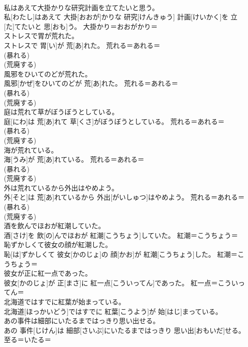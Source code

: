 \documentclass[8pt]{extreport}
\begin{document}
\begin{CJK}{UTF8}{min}
{\\	私はあえて大掛かりな研究計画を立てたいと思う。	
\\	私[わたし]はあえて 大掛[おおが]かりな 研究[けんきゅう] 計画[けいかく]を 立[た]てたいと 思[おも]う。	大掛かり＝おおがかり＝ 
\\	ストレスで胃が荒れた。	
\\	ストレスで 胃[い]が 荒[あ]れた。	荒れる＝あれる＝ 
\\	(暴れる) 
\\	(荒廃する) 
\\	風邪をひいてのどが荒れた。	
\\	風邪[かぜ]をひいてのどが 荒[あ]れた。	荒れる＝あれる＝ 
\\	(暴れる) 
\\	(荒廃する) 
\\	庭は荒れて草がぼうぼうとしている。	
\\	庭[にわ]は 荒[あ]れて 草[くさ]がぼうぼうとしている。	荒れる＝あれる＝ 
\\	(暴れる) 
\\	(荒廃する) 
\\	海が荒れている。	
\\	海[うみ]が 荒[あ]れている。	荒れる＝あれる＝ 
\\	(暴れる) 
\\	(荒廃する) 
\\	外は荒れているから外出はやめよう。	
\\	外[そと]は 荒[あ]れているから 外出[がいしゅつ]はやめよう。	荒れる＝あれる＝ 
\\	(暴れる) 
\\	(荒廃する) 
\\	酒を飲んでほおが紅潮していた。	
\\	酒[さけ]を 飲[の]んでほおが 紅潮[こうちょう]していた。	紅潮＝こうちょう＝ 
\\	恥ずかしくて彼女の顔が紅潮した。	
\\	恥[は]ずかしくて 彼女[かのじょ]の 顔[かお]が 紅潮[こうちょう]した。	紅潮＝こうちょう＝ 
\\	彼女が正に紅一点であった。	
\\	彼女[かのじょ]が 正[まさ]に 紅一点[こういってん]であった。	紅一点＝こういってん＝ 
\\	北海道ではすでに紅葉が始まっている。	
\\	北海道[ほっかいどう]ではすでに 紅葉[こうよう]が 始[はじ]まっている。	
\\	あの事件は細部にいたるまではっきり思い出せる。	
\\	あの 事件[じけん]は 細部[さいぶ]にいたるまではっきり 思い出[おもいだ]せる。	至る＝いたる＝ 
}
\end{CJK}
\end{document}
